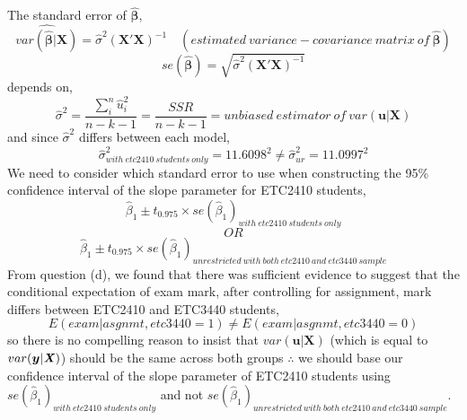 \documentclass[12pt]{report}
\begin{document}
\noindent The standard error of $\boldsymbol{\hat{\beta}}$,
$$\widehat{var({\boldsymbol{\hat{\beta}}|\boldsymbol{X}})} = \hat{\sigma}^2(\boldsymbol{X'X})^{-1} \quad (estimated\ variance-covariance\ matrix\ of\ \boldsymbol{\hat{\beta}})$$
$$se(\boldsymbol{\hat{\beta}}) = \sqrt{\hat{\sigma}^2(\boldsymbol{X'X})^{-1}}$$
\noindent depends on,
$$\hat{\sigma}^2 = \dfrac{\sum_{i}^{n}\hat{u}_{i}^{2}}{n-k-1} = \dfrac{SSR}{n-k-1} = unbiased\ estimator\ of\ var(\boldsymbol{u}|\boldsymbol{X})$$
and since $\hat{\sigma}^2$ differs between each model,
$$\hat{\sigma}^2_{with\ etc2410\ students\ only} = 11.6098^2 \neq \hat{\sigma}^2_{ur} = 11.0997^2$$
\noindent We need to consider which standard error to use when constructing the 95\% confidence interval of the slope parameter for ETC2410 students,
$$\hat{\beta}_1 \pm t_{0.975} \times se(\hat{\beta}_1)_{with\ etc2410\ students\ only}$$
$$OR$$
$$\hat{\beta}_1 \pm t_{0.975} \times se(\hat{\beta}_1)_{unrestricted\ with\ both\ etc2410\ and\ etc3440\ sample}$$
\noindent From question (d), we found that there was sufficient evidence to suggest that the conditional expectation of exam mark, after controlling for assignment, mark differs between ETC2410 and ETC3440 students, $$E(exam|asgnmt, etc3440=1) \neq E(exam|asgnmt, etc3440=0) $$ so there is no compelling reason to insist that $var(\boldsymbol{u}|\boldsymbol{X})$ (which is equal to $var(\boldsymbol{y}|\textbf{\textit{X}})$) should be the same across both groups $\therefore$ we should base our confidence interval of the slope parameter of ETC2410 students using $se(\hat{\beta}_1)_{with\ etc2410\ students\ only}$ and not $se(\hat{\beta}_1)_{unrestricted\ with\ both\ etc2410\ and\ etc3440\ sample}$.
\end{document}
